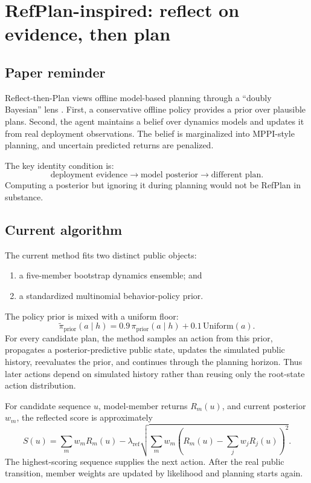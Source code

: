 \documentclass[11pt,a4paper]{article}
\begin{document}
\section{RefPlan-inspired: reflect on evidence, then plan}

\subsection{Paper reminder}

Reflect-then-Plan views offline model-based planning through a ``doubly Bayesian'' lens
\cite{refplan2025}. First, a conservative offline policy provides a prior over plausible plans.
Second, the agent maintains a belief over dynamics models and updates it from real deployment
observations. The belief is marginalized into MPPI-style planning, and uncertain predicted returns
are penalized.

The key identity condition is:
\[
\text{deployment evidence}\longrightarrow\text{model posterior}
\longrightarrow\text{different plan}.
\]
Computing a posterior but ignoring it during planning would not be RefPlan in substance.

\subsection{Current algorithm}

The current method fits two distinct public objects:

\begin{enumerate}[leftmargin=*]
  \item a five-member bootstrap dynamics ensemble; and
  \item a standardized multinomial behavior-policy prior.
\end{enumerate}

The policy prior is mixed with a uniform floor:
\[
\widetilde\pi_{\mathrm{prior}}(a\mid h)
=0.9\,\pi_{\mathrm{prior}}(a\mid h)+0.1\,\mathrm{Uniform}(a).
\]
For every candidate plan, the method samples an action from this prior, propagates a
posterior-predictive public state, updates the simulated public history, reevaluates the prior, and
continues through the planning horizon. Thus later actions depend on simulated history rather than
reusing only the root-state action distribution.

For candidate sequence $u$, model-member returns $R_m(u)$, and current posterior $w_m$, the
reflected score is approximately
\[
S(u)=\sum_m w_mR_m(u)
-\lambda_{\mathrm{ref}}
\sqrt{\sum_m w_m\left(R_m(u)-\sum_jw_jR_j(u)\right)^2}.
\]
The highest-scoring sequence supplies the next action. After the real public transition, member
weights are updated by likelihood and planning starts again.
\end{document}
